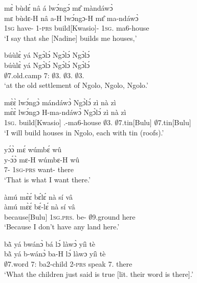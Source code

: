 \begin{exe}[(C234)]  
\exC\label{219} 
  \glll mɛ̀ bùdɛ́ nâ á lwɔ́ngɔ́ mɛ̂ màndáwɔ̀\\
        mɛ bùdɛ-H nâ a-H lwɔ́ngɔ-H mɛ̂ ma-ndáwɔ̀ \\
       1\textsc{sg} have-{\R} {\COMP} 1-\textsc{prs} build[Kwasio]-{\R} 1\textsc{sg}.{\OBJ} ma6-house   \\
    \trans `I say that she [Nadine] builds me houses,'
 
\exC\label{220} 
  \glll  búùlɛ̀ yá Ngɔ̀lɔ́ Ngɔ̀lɔ́ Ngɔ̀lɔ́ \\
          búùlɛ̀ yá Ngɔ̀lɔ́ Ngɔ̀lɔ́ Ngɔ̀lɔ́ \\
         $\emptyset$7.old.camp 7:{\ATT}  $\emptyset$3.{\PN} $\emptyset$3.{\PN} $\emptyset$3.{\PN} \\
    \trans `at the old settlement of Ngolo, Ngolo, Ngolo.'
 
\exC\label{221} 
  \glll mɛ̀ɛ̀ lwɔ́ngɔ̀ mándáwɔ̀ Ngɔ̀lɔ́ zì nà zì\\
        mɛ̀ɛ̀ lwɔ́ngɔ H-ma-ndáwɔ̀ Ngɔ̀lɔ́ zì nà zì \\
        1\textsc{sg}.{\FUT} build[Kwasio] {\OBJ}.{\LINK}-ma6-house $\emptyset$3.{\PN} $\emptyset$7.tin[Bulu] {\COM} $\emptyset$7.tin[Bulu]  \\
    \trans `I will build houses in Ngolo, each with tin (roofs).'
 
\exC\label{222} 
  \glll  yɔ́ɔ̀ mɛ́ wúmbɛ́ wû \\
        y-ɔ́ɔ̀ mɛ-H wúmbɛ-H wû \\
         7-{\OBJ} 1\textsc{sg}-\textsc{prs} want-{\R} there \\
    \trans `That is what I want there.'
 
\exC\label{223} 
  \glll  àmú mɛ̀ɛ́ bɛ́lɛ́ nà sí vâ \\
         àmú mɛ̀ɛ́ bɛ́-lɛ́ nà sí vâ \\
         because[Bulu] 1\textsc{sg}.\textsc{prs}.{\NEG} be-{\NEG} {\COM} $\emptyset$9.ground here \\
    \trans `Because I don't have any land here.'
 
\exC\label{224} 
  \glll  bã̀ yá bwánɔ̀ bá lɔ́ làwɔ̀ yíì tè \\
         bã̀ yá b-wánɔ̀ ba-H lɔ́ làwɔ yíì tè \\
         $\emptyset$7.word 7:{\ATT}  ba2-child 2-\textsc{prs} {\RETRO}  speak 7.{\COP} there \\
    \trans `What the children just said is true [lit. their word is there].'
 

\end{exe}
